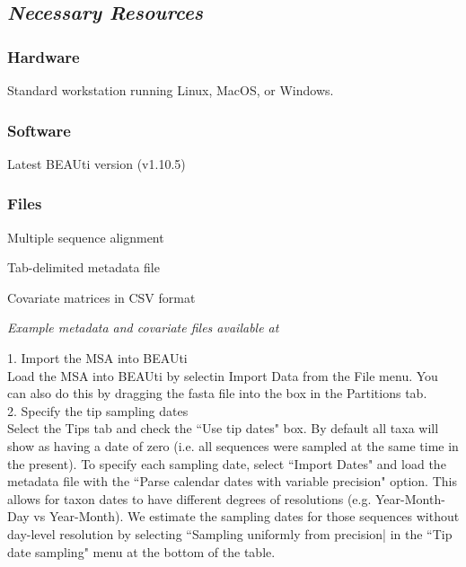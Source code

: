 \documentclass{article}
\newcommand{\ann}[1]{
\begin{adjustwidth}{0.5cm}{}
\it{#1}\\
\end{adjustwidth}}
\newcommand{\code}[1]{
{\upshape\ttfamily{#1}}}
\begin{document}
\subsection*{\textbf{\textit{Necessary Resources}}}
\subsubsection*{Hardware}
\hspace{0.5cm}Standard workstation running Linux, MacOS, or Windows. 

\subsubsection*{Software}
\hspace{0.5cm}Latest BEAUti version (v1.10.5)

\subsubsection*{Files}
\hspace{0.5cm}Multiple sequence alignment

\hspace{0.5cm}Tab-delimited metadata file

\hspace{0.5cm}Covariate matrices in CSV format\\

\ann{Example metadata and covariate files available at\code{gihutb}}

1. Import the MSA into BEAUti\\

Load the MSA into BEAUti by selectin Import Data from the File menu. You can also do this by dragging the fasta file into the box in the Partitions tab.\\

2. Specify the tip sampling dates\\

Select the Tips tab and check the ``Use tip dates" box. By default all taxa will show as having a date of zero (i.e. all sequences were sampled at the same time in the present). To specify each sampling date, select ``Import Dates" and load the metadata file with the ``Parse calendar dates with variable precision" option. This allows for taxon dates to have different degrees of resolutions (e.g. Year-Month-Day vs Year-Month). We estimate the sampling dates for those sequences without day-level resolution by selecting ``Sampling uniformly from precision| in the ``Tip date sampling" menu at the bottom of the table. \\
\end{document}
